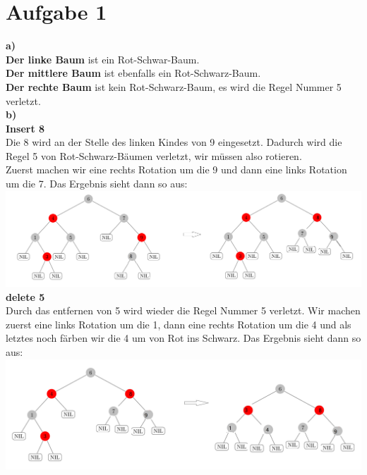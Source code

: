 \documentclass[12pt,a4paper,headsepline]{scrreprt}
\begin{document}


\section*{Aufgabe 1}
\textbf{a)}\\
\textbf{Der linke Baum} ist ein Rot-Schwar-Baum.\\

\textbf{Der mittlere Baum} ist ebenfalls ein Rot-Schwarz-Baum.\\

\textbf{Der rechte Baum} ist kein Rot-Schwarz-Baum, es wird die Regel Nummer 5 verletzt.\\

\textbf{b)}\\
\textbf{Insert 8}\\
Die 8 wird an der Stelle des linken Kindes von 9 eingesetzt. Dadurch wird die Regel 5 von Rot-Schwarz-Bäumen verletzt, wir müssen also rotieren.\\
Zuerst machen wir eine rechts Rotation um die 9 und dann eine links Rotation um die 7. Das Ergebnis sieht dann so aus:\\

\includegraphics[scale=0.23]{insert}\\

\textbf{delete 5}\\
Durch das entfernen von 5 wird wieder die Regel Nummer 5 verletzt. Wir machen zuerst eine links Rotation um die 1, dann eine rechts Rotation um die 4 und als letztes noch färben wir die 4 um von Rot ins Schwarz. Das Ergebnis sieht dann so aus:\\

\includegraphics[scale=0.25]{delete}\\
\end{document}
